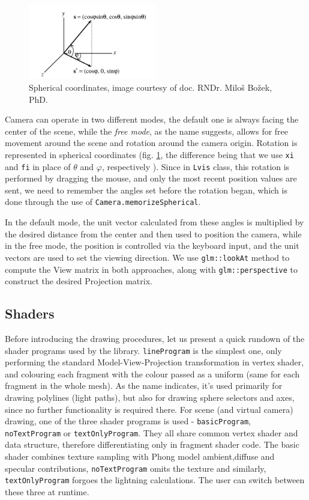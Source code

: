 \begin{figure}[h]
    \centering
    \includegraphics[width=0.5\textwidth]{spher.png}
    \caption{Spherical coordinates, image courtesy of doc. RNDr. Miloš Božek, PhD.}
    \label{fig:spher}
\end{figure}

Camera can operate in two different modes, the default one is always facing the center of the scene, while the \emph{free mode}, as the name suggests, allows for free movement around the scene and rotation around the camera origin. Rotation is represented in spherical coordinates (fig. \ref{fig:spher}, the difference being that we use \texttt{xi} and \texttt{fi} in place of $\theta$ and $\varphi$, respectively ). Since in \texttt{Lvis} class, this rotation is performed by dragging the mouse, and only the most recent position values are sent, we need to remember the angles set before the rotation began, which is done through the use of \texttt{Camera.memorizeSpherical}. 

In the default mode, the unit vector calculated from these angles is multiplied by the desired distance from the center and then used to position the camera, while in the free mode, the position is controlled via the keyboard input, and the unit vectors are used to set the viewing direction. We use \texttt{glm::lookAt} method to compute the View matrix in both approaches, along with \texttt{glm::perspective} to construct the desired Projection matrix.   
 
\subsection{Shaders}

Before introducing the drawing procedures, let us present a quick rundown of the shader programs used by the library. \texttt{lineProgram} is the simplest one, only performing the standard Model-View-Projection transformation in vertex shader, and colouring each fragment with the colour passed as a uniform (same for each fragment in the whole mesh). As the name indicates, it's used primarily for drawing polylines (light paths), but also for drawing sphere selectors and axes, since no further functionality is required there. For scene (and virtual camera) drawing, one of the three shader programs is used - \texttt{basicProgram}, \texttt{noTextProgram} or \texttt{textOnlyProgram}. They all share common vertex shader and data structure, therefore differentiating only in fragment shader code. The basic shader combines texture sampling with Phong model ambient,diffuse and specular contributions, \texttt{noTextProgram} omits the texture and similarly, \texttt{textOnlyProgram} forgoes the lightning calculations. The user can switch between these three at runtime.

